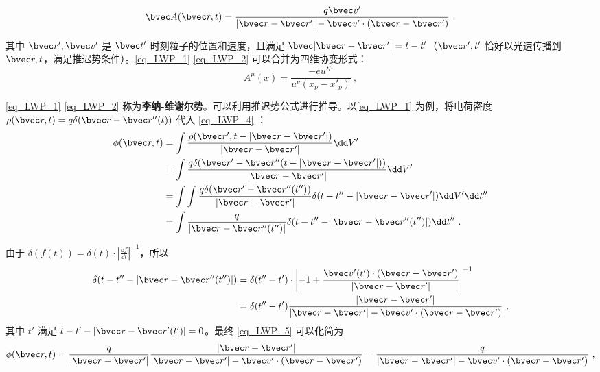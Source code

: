 \begin{equation}\label{eq_LWP_2}
\bvec A(\bvec r,t)=\frac{q\bvec v'}{|\bvec r-\bvec r'|-\bvec v'\cdot (\bvec r-\bvec r')}~.
\end{equation}

其中 $\bvec r',\bvec v'$ 是 $\bvec t'$ 时刻粒子的位置和速度，且满足 $\bvec |\bvec r-\bvec r'|=t-t'$（$\bvec r',t'$ 恰好以光速传播到 $\bvec r,t$，满足推迟势条件）。\autoref{eq_LWP_1} \autoref{eq_LWP_2} 可以合并为四维协变形式：
\begin{equation}
A^\mu(x)=\frac{-e u'^\mu}{u^\nu (x_\nu-x'_\nu)}~,
\end{equation}

\autoref{eq_LWP_1} \autoref{eq_LWP_2} 称为\textbf{李纳-维谢尔势}。可以利用推迟势公式进行推导。以\autoref{eq_LWP_1} 为例，将电荷密度 $\rho(\bvec r,t)=q\delta(\bvec r-\bvec r''(t))$ 代入 
\autoref{eq_LWP_4} ：
\begin{equation}\label{eq_LWP_5}
\begin{aligned}
\phi(\bvec r,t)&=\int \frac{\rho(\bvec r',t-|\bvec r-\bvec r'|)}{|\bvec r-\bvec r'|}\dd V'\\
&=\int \frac{q\delta(\bvec r'-\bvec r''(t-|\bvec r-\bvec r'|))}{|\bvec r-\bvec r'|}\dd V'\\
&=\int \int \frac{q\delta(\bvec r'-\bvec r''(t''))}{|\bvec r-\bvec r'|}\delta (t-t''-|\bvec r-\bvec r'|)\dd V'\dd t''\\
&=\int \frac{q}{|\bvec r-\bvec r''(t'')|}\delta (t-t''-|\bvec r-\bvec r''(t'')|)\dd t''~.
\end{aligned}\\
\end{equation}

由于 $\delta(f(t))=\delta(t)\cdot \left|\frac{\dd f}{\dd t}\right|^{-1}$，所以
\begin{equation}
\begin{aligned}
\delta (t-t''-|\bvec r-\bvec r''(t'')|)&=\delta(t''-t')\cdot \left|-1+\frac{\bvec v'(t')\cdot (\bvec r-\bvec r')}{|\bvec r-\bvec r'|}\right|^{-1}\\
&=\delta(t''-t')\frac{|\bvec r-\bvec r'|}{|\bvec r-\bvec r'|-\bvec v'\cdot (\bvec r-\bvec r')}~,
\end{aligned}
\end{equation}
其中 $t'$ 满足 $t-t'-|\bvec r-\bvec r'(t')|=0$。最终 \autoref{eq_LWP_5} 可以化简为
\begin{equation}
\phi(\bvec r,t)=\frac{q}{|\bvec r-\bvec r'|}\frac{|\bvec r-\bvec r'|}{|\bvec r-\bvec r'|-\bvec v'\cdot (\bvec r-\bvec r')}=\frac{q}{|\bvec r-\bvec r'|-\bvec v'\cdot (\bvec r-\bvec r')}~,
\end{equation}

